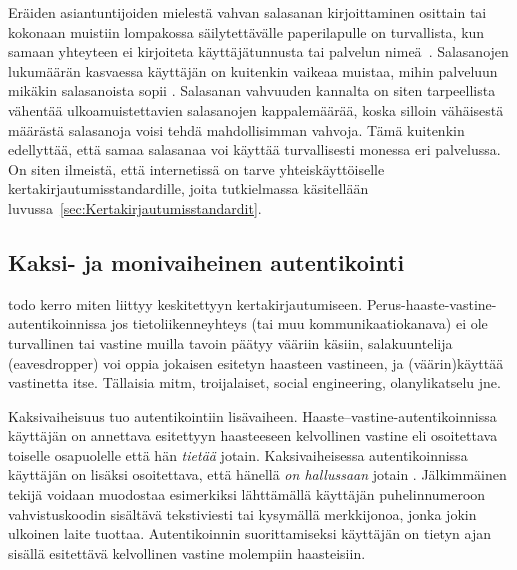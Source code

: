 \documentclass[finnish,gradu]{tktltiki}
\begin{document}
  Eräiden asiantuntijoiden mielestä vahvan salasanan kirjoittaminen osittain tai kokonaan muistiin lompakossa säilytettävälle paperilapulle on turvallista, kun samaan yhteyteen ei kirjoiteta käyttäjätunnusta tai palvelun nimeä~\cite{fsecure_passwords_on_postit_09, microsoft_guru_write_your_password_05, schneier_changing_passwords_10, schneier_choosing_passwords_07, schneier_write_down_your_password_05}. Salasanojen lukumäärän kasvaessa käyttäjän on kuitenkin vaikeaa muistaa, mihin palveluun mikäkin salasanoista sopii \cite{study_of_passwords_07}. Salasanan vahvuuden kannalta on siten tarpeellista vähentää ulkoamuistettavien salasanojen kappalemäärää, koska silloin vähäisestä määrästä salasanoja voisi tehdä mahdollisimman vahvoja. Tämä kuitenkin edellyttää, että samaa salasanaa voi käyttää turvallisesti monessa eri palvelussa. On siten ilmeistä, että internetissä on tarve yhteiskäyttöiselle kertakirjautumisstandardille, joita tutkielmassa käsitellään luvussa~\ref{sec:Kertakirjautumisstandardit}.



  \subsection{Kaksi- ja monivaiheinen autentikointi} %
  \label{sub:kaksivaiheinen_autentikointi}

  todo kerro miten liittyy keskitettyyn kertakirjautumiseen.
  Perus-haaste-vastine-autentikoinnissa jos tietoliikenneyhteys (tai muu kommunikaatiokanava) ei ole turvallinen tai vastine muilla tavoin päätyy vääriin käsiin, salakuuntelija (eavesdropper) voi oppia jokaisen esitetyn haasteen vastineen, ja (väärin)käyttää vastinetta itse.
  Tällaisia mitm, troijalaiset, social engineering, olanylikatselu jne.

  Kaksivaiheisuus tuo autentikointiin lisävaiheen. Haaste--vastine-autentikoinnissa käyttäjän on annettava esitettyyn haasteeseen kelvollinen vastine eli osoitettava toiselle osapuolelle että hän \emph{tietää} jotain. Kaksivaiheisessa autentikoinnissa käyttäjän on lisäksi osoitettava, että hänellä \emph{on hallussaan} jotain \cite{NIST_SP800-63-1, google_2step_2010}. Jälkimmäinen tekijä voidaan muodostaa esimerkiksi lähttämällä käyttäjän puhelinnumeroon vahvistuskoodin sisältävä tekstiviesti tai kysymällä merkkijonoa, jonka jokin ulkoinen laite tuottaa. Autentikoinnin suorittamiseksi käyttäjän on tietyn ajan sisällä esitettävä kelvollinen vastine molempiin haasteisiin.
\end{document}
